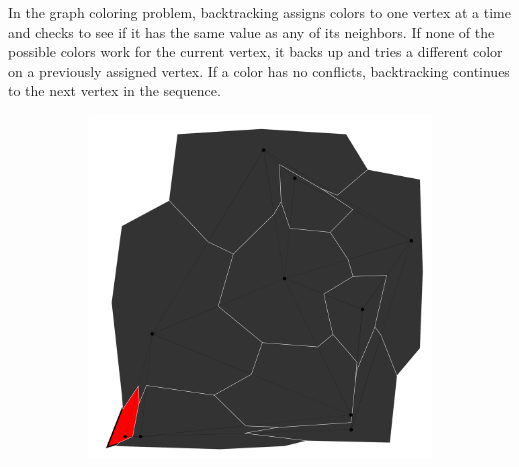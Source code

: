 \documentclass{article}
\begin{document}
		In the graph coloring problem, backtracking assigns colors to one vertex at a time and checks to see if it has the same value as any of its neighbors. If none of the possible colors work for the current vertex, it backs up and tries a different color on a previously assigned vertex. If a color has no conflicts, backtracking continues to the next vertex in the sequence.
		
		\begin{figure}[h!]
			\begin{subfigure}{0.18\textwidth}
				\centering
				\includegraphics[width=\textwidth]{images/sequences/simple_backtracking/bt_simple_I00001}
				\caption{}
				\label{bta}
			\end{subfigure}
			\;
			\begin{subfigure}{0.18\textwidth}
				\centering

\end{subfigure}
\end{figure}
\end{document}
